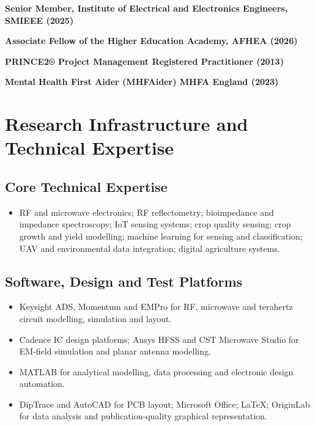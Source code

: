\documentclass[a4paper,11pt]{article}
\newcommand{\qualification}[1]{%
    \textbf{#1}\par
    \vspace{4pt}
}
\begin{document}
\qualification{Senior Member, Institute of Electrical and Electronics Engineers, SMIEEE (2025)}

\qualification{Associate Fellow of the Higher Education Academy, AFHEA (2026)}

\qualification{PRINCE2® Project Management Registered Practitioner (2013)}

\qualification{Mental Health First Aider (MHFAider) MHFA England (2023)}


\section{Research Infrastructure and Technical Expertise}

\subsection*{Core Technical Expertise}

\begin{itemize}
    \item RF and microwave electronics; RF reflectometry; bioimpedance and impedance spectroscopy; IoT sensing systems; crop quality sensing; crop growth and yield modelling; machine learning for sensing and classification; UAV and environmental data integration; digital agriculture systems.
\end{itemize}

\subsection*{Software, Design and Test Platforms}

\begin{itemize}
    \item Keysight ADS, Momentum and EMPro for RF, microwave and terahertz circuit modelling, simulation and layout.
    \item Cadence IC design platforms; Ansys HFSS and CST Microwave Studio for EM-field simulation and planar antenna modelling.
    \item MATLAB for analytical modelling, data processing and electronic design automation.
    \item DipTrace and AutoCAD for PCB layout; Microsoft Office; \LaTeX{}; OriginLab for data analysis and publication-quality graphical representation.
\end{itemize}
\end{document}
